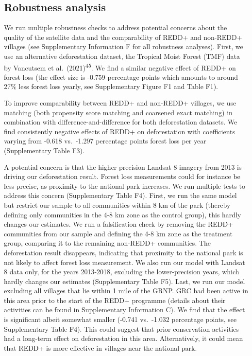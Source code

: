 \documentclass[
]{article}
\begin{document}
\hypertarget{robustness-analysis}{%
\subsection{Robustness analysis}\label{robustness-analysis}}

We run multiple robustness checks to address potential concerns about
the quality of the satellite data and the comparability of REDD+ and
non-REDD+ villages (see Supplementary Information F for all robustness
analyses). First, we use an alternative deforestation dataset, the
Tropical Moist Forest (TMF) data by Vancutsem et
al.~(2021)\textsuperscript{45}. We find a similar negative effect of
REDD+ on forest loss (the effect size is -0.759 percentage points which
amounts to around 27\% less forest loss yearly, see Supplementary Figure
F1 and Table F1).

To improve comparability between REDD+ and non-REDD+ villages, we use
matching (both propensity score matching and coarsened exact matching)
in combination with difference-and-difference for both deforestation
datasets. We find consistently negative effects of REDD+ on
deforestation with coefficients varying from -0.618 vs.~-1.297
percentage points forest loss per year (Supplementary Table F3).

A potential concern is that the higher precision Landsat 8 imagery from
2013 is driving our deforestation result. Forest loss measurements could
for instance be less precise, as proximity to the national park
increases. We run multiple tests to address this concern (Supplementary
Table F4). First, we run the same model but restrict our sample to all
communities within 8 km of the park (thereby defining only communities
in the 4-8 km zone as the control group), this hardly changes our
estimates. We run a falsification check by removing the REDD+
communities from our sample and defining the 4-8 km zone as the
treatment group, comparing it to the remaining non-REDD+ communities.
The deforestation result disappears, indicating that proximity to the
national park is not likely to affect forest loss measurement. We also
run our model with Landsat 8 data only, for the years 2013-2018,
excluding the lower-precision years, which hardly changes our estimates
(Supplementary Table F5). Last, we run our model excluding all villages
that lie within 1 mile of the GRNP. GRC had been active in this area
prior to the start of the REDD+ programme (details about their
activities can be found in Supplementary Information C). We find that
the effect is significant albeit somewhat smaller (-0.741 vs.~-1.032
percentage points, see Supplementary Table F4). This could suggest that
prior conservation activities had a long-term effect on deforestation in
this area. Alternatively, it could mean that REDD+ is more effective in
villages near the national park.
\end{document}
